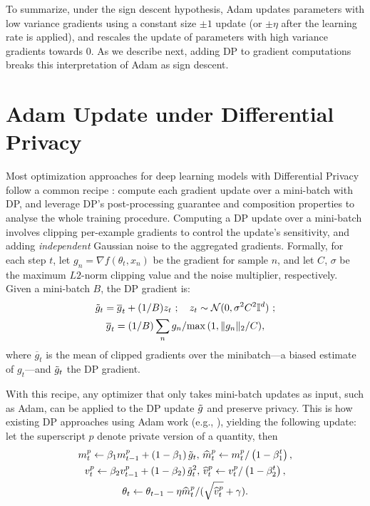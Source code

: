 \documentclass[letterpaper]{article} %
\def\cN{\mathcal{N}}
\def\I{\mathbb{I}}
\begin{document}
To summarize, under the sign descent hypothesis, Adam  updates parameters with low variance gradients using a constant size $\pm 1$ update (or $\pm \eta$ after the learning rate is applied), and rescales the update of parameters with high variance gradients towards $0$. As we describe next, adding DP to gradient computations breaks this interpretation of Adam as sign descent.

\section{Adam Update under Differential Privacy}
\label{sec:motiv}
Most optimization approaches for deep learning models with Differential Privacy follow a common recipe \cite{abadi2016deep}: compute each gradient update over a mini-batch with DP, and leverage DP's post-processing guarantee and composition properties to analyse the whole training procedure.
%
Computing a DP update over a mini-batch involves clipping per-example gradients to control the update's sensitivity, and adding {\em independent} Gaussian noise to the aggregated gradients.
Formally, for each step $t$, let $g_{n} = \nabla f(\theta_t, x_n)$ be the gradient for sample $n$, and let $C$, $\sigma$ be the maximum $L2$-norm clipping value and the noise multiplier, respectively. Given a mini-batch $B$, the DP gradient is:
\begin{gather*}
    \Tilde{g}_t = \overline{g}_t + (1/B) z_t \ ; \ \ \ z_t \sim \cN(0, \sigma^{2}C^{2}\I^{d}) \ ; \\
    \overline{g}_t = (1/B)\sum_{n} g_{n} / {\max{(1, \lVert g_n \rVert_{2}/C})},
\end{gather*}
where $\overline{g}_t$ is the mean of clipped gradients over the minibatch---a biased estimate of $g_t$---and $\Tilde{g}_t$ the DP gradient.

With this recipe, any optimizer that only takes mini-batch updates as input, such as Adam, can be applied to the DP update $\Tilde{g}$ and preserve privacy. This is how existing DP approaches using Adam work (e.g., \cite{li2021}), yielding the following update: let the superscript $p$ denote private version of a quantity, then
\begin{gather*}
    m_{t}^{p} \leftarrow \beta_{1} m_{t-1}^{p} + \left(1-\beta_{1}\right) \Tilde{g}_t, \, \widehat{m}_{t}^{p} \leftarrow m_{t}^{p} /\left(1-\beta_{1}^{t}\right), \\
    v_{t}^{p} \leftarrow \beta_{2} v_{t-1}^{p}+\left(1-\beta_{2}\right) \Tilde{g}_t^{2}, \, \widehat{v}_{t}^{p} \leftarrow v^p_{t} /\left(1-\beta_{2}^{t}\right), \\
    \theta_t \leftarrow \theta_{t-1} - \eta \widehat{m}_{t}^{p} / (\sqrt{\widehat{v}_{t}^{p}} + \gamma).
\end{gather*}
\end{document}

